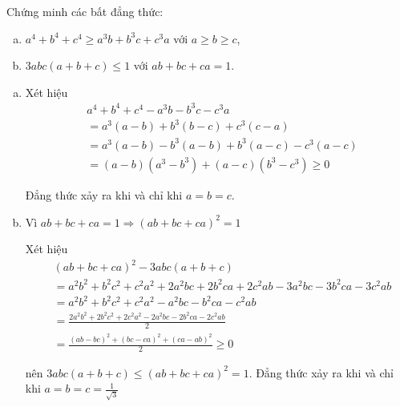 \begin{problem}
    Chứng minh các bất đẳng thức:
    \begin{enumerate}[(a)]
        \item $a^4 + b^4 + c^4 \ge a^3b + b^3c + c^3a$ với $a \ge b \ge c$,
        \item $3abc(a + b + c) \le 1$ với $ab + bc + ca = 1$.
    \end{enumerate}

    \solution

    \begin{enumerate}[(a)]
    \item 
        Xét hiệu 
            \begin{align*}
            &a^4 + b^4 + c^4 - a^3b - b^3c - c^3a \\ 
            &= a^3(a - b) + b^3(b - c) + c^3(c - a) \\
            &= a^3(a - b) - b^3(a - b) + b^3(a - c) - c^3(a - c) \\
            &= (a - b)(a^3 - b^3) + (a - c)(b^3 - c^3) \ge 0
            \end{align*}

        Đẳng thức xảy ra khi và chỉ khi $a = b = c$. \\

    \item 
        Vì $ab + bc + ca = 1 \Rightarrow (ab + bc + ca)^2 = 1$

        Xét hiệu
            \begin{align*}
            &(ab + bc + ca)^2 - 3abc(a + b + c) \\
            &= a^2b^2 + b^2c^2 + c^2a^2 + 2a^2bc + 2b^2ca + 2c^2ab - 3a^2bc - 3b^2ca - 3c^2ab \\
            &= a^2b^2 + b^2c^2 + c^2a^2 - a^2bc - b^2ca - c^2ab \\
            &= \frac{2a^2b^2 + 2b^2c^2 + 2c^2a^2 - 2a^2bc - 2b^2ca - 2c^2ab}{2} \\
            &= \frac{(ab - bc)^2 + (bc - ca)^2 + (ca - ab)^2}{2} \ge 0
            \end{align*}

        nên $3abc(a + b + c) \le (ab + bc + ca)^2 = 1$.
        Đẳng thức xảy ra khi và chỉ khi $a = b = c = \displaystyle \frac{1}{\sqrt{3}}$
    \end{enumerate}

\end{problem}